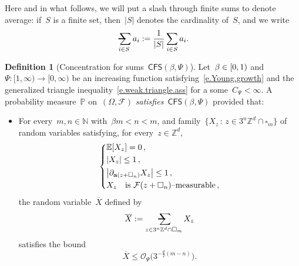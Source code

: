 \documentclass[11pt,twoside]{article} %
\makeatletter
\let\oldsquare\square %
\renewcommand{\square}{\oldsquare}
\numberwithin{equation}{section}
\theoremstyle{definition}
\newtheorem{definition}[theorem]{Definition}
\let\originalleft\left
\let\originalright\right
\renewcommand{\left}{\mathopen{}\mathclose\bgroup\originalleft}
\renewcommand{\right}{\aftergroup\egroup\originalright}
\newcommand*{\N}{\ensuremath{\mathbb{N}}}
\newcommand*{\Zd}{\ensuremath{\mathbb{Z}^d}}
\renewcommand{\a}{\mathbf{a}}
\newcommand{\cu}{\square}
\newcommand{\F}{\mathcal{F}}
\renewcommand{\P}{\mathbb{P}}
\newcommand{\E}{\mathbb{E}}
\renewcommand{\O}{\mathcal{O}}
\newcommand{\avsum}{\mathop{\mathpalette\avsuminner\relax}\displaylimits}
\newcommand\avsuminner[2]{%
  {\sbox0{$\m@th#1\sum$}%
   \vphantom{\usebox0}%
   \ooalign{%
     \hidewidth
     \smash{\,\rule[.23em]{8.8pt}{1.1pt} \relax}%
     \hidewidth\cr
   ~$\m@th#1\sum$\cr
   }%
  }%
}
\newcommand{\CFS}{\mathsf{CFS}}
\makeatother
\begin{document}
\smallskip

Here and in what follows, we will put a slash through finite sums to denote average: if~$S$ is a finite set, then~$|S|$ denotes the cardinality of~$S$, and we write
\begin{equation*}
\avsum_{i \in S} a_i := \frac{1}{|S|} \sum_{i\in S} a_i.
\end{equation*}

\begin{definition}[Concentration for sums~$\CFS(\beta,\Psi)$]
\label{d.CFS}
Let~$\beta \in \left[0,1\right)$ and~$\Psi:[1,\infty) \to [0,\infty)$ be an increasing function satisfying~\eqref{e.Young.growth} and the generalized triangle inequality~\eqref{e.weak.triangle.ass} for a some~$C_\Psi<\infty$.
A probability measure~$\P$ on~$(\Omega,\F)$ \emph{satisfies~$\CFS(\beta,\Psi)$} provided that: 
\begin{itemize}
\item
For every~$m,n\in\N$ with~$\beta m < n<m$, and  family~$\{ X_z \,:\, z\in 3^n\Zd\cap \cu_m\}$ of random variables satisfying, for every~$z\in\Zd$,
\begin{equation} 
\label{e.CFS.ass}
\left\{
\begin{aligned}
& \E\left[ X_z \right]=0 \,, 
\\ & 
\left| X_z \right| \leq 1\,,
\\ &   
\left| \partial_{\a(z+\cu_n)} X_z\right| \leq 1 \,,
\\
& X_z \quad \mbox{is~$\F(z+\cu_n)$--measurable} \,, \\
\end{aligned}
\right.
\end{equation}
the random variable~$\overline{X}$ defined by
\begin{equation} 
\label{e.Z.norm}
\overline{X}  :=  \avsum_{z\in 3^n\Zd\cap \cu_m}  X_z
\end{equation}
satisfies the bound
\begin{equation}
\label{e.CFS}
\overline{X}
\leq
\O_{\Psi}
\bigl( 3^{-\frac d2(m-n)} \bigr).
\end{equation}
\end{itemize}
\end{definition}
\end{document}
